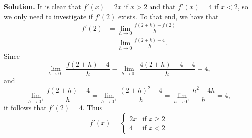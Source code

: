 \begin{enumerate}
      \textbf{Solution.} It is clear that $f'(x) = 2x$ if $x > 2$ and that
      $f'(x) = 4$ if $x < 2$, so we only need to investigate if $f'(2)$ exists.
      To that end, we have that
      \begin{align*}
         f'(2) &= \lim_{h \to 0} \frac{f(2 + h) - f(2)}{h} \\
               &= \lim_{h \to 0} \frac{f(2 + h) - 4}{h}.
      \end{align*}
      Since
      $$\lim_{h \to 0^-} \frac{f(2 + h) - 4}{h} = \lim_{h \to 0^-} \frac{4(2+h)
         - 4 - 4}{h} = 4,$$
      and
      $$\lim_{h \to 0^+} \frac{f(2 + h) - 4}{h} = \lim_{h \to 0^+} \frac{(2+h)^2
         - 4}{h} = \lim_{h \to 0^+} \frac{h^2 + 4h}{h} = 4,$$
      it follows that $f'(2) = 4$. Thus
      \begin{equation*}
         f'(x) = \left\{\begin{array}{rl}
            2x & \text{if } x \ge 2 \\
            4 & \text{if } x < 2
         \end{array} \right. 
      \end{equation*}
\end{enumerate}
